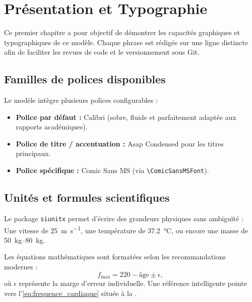 \section{Présentation et Typographie}
\label{sec:presentation}

Ce premier chapitre a pour objectif de démontrer les capacités graphiques et typographiques de ce modèle.
Chaque phrase est rédigée sur une ligne distincte afin de faciliter les revues de code et le versionnement sous Git.

\subsection{Familles de polices disponibles}
\label{subsec:polices}

Le modèle intègre plusieurs polices configurables :
\begin{itemize}
  \item \textbf{Police par défaut :} Calibri (sobre, fluide et parfaitement adaptée aux rapports académiques).
  \item \textbf{Police de titre / accentuation :} {\AsapFont Asap Condensed pour les titres principaux}.
  \item \textbf{Police spécifique :} {\ComicSansMSFont Comic Sans MS} (via \texttt{\textbackslash ComicSansMSFont}).
\end{itemize}

\subsection{Unités et formules scientifiques}
\label{subsec:sciences}

Le package \texttt{siunitx} permet d'écrire des grandeurs physiques sans ambiguïté :
Une vitesse de \qty{25}{\meter\per\second}, une température de \qty{37.2}{\degreeCelsius}, ou encore une masse de \qtyrange{50}{80}{\kilo\gram}.

Les équations mathématiques sont formatées selon les recommandations modernes :
\begin{equation}
  \label{eq:frequence_cardiaque}
  f_{\text{max}} = 220 - \text{âge} \pm \epsilon,
\end{equation}
où $\epsilon$ représente la marge d'erreur individuelle.
Une référence intelligente pointe vers l'\cref{eq:frequence_cardiaque} située à la .


